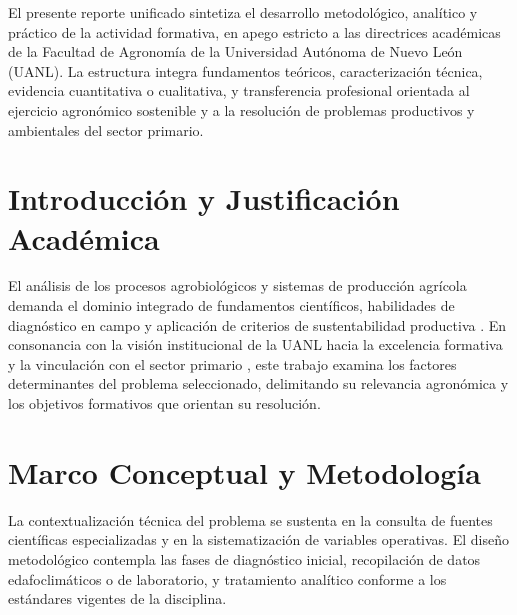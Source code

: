 \documentclass[
	spanish,
	letterpaper,
	oneside
]{article}
\begin{document}
\institutionalWatermark[0.08]{\careerwatermarkimage}
\templatePortrait

\templatePagecfg

\begin{abstractd}
El presente reporte unificado sintetiza el desarrollo metodológico, analítico y práctico de la actividad formativa, en apego estricto a las directrices académicas de la Facultad de Agronomía de la Universidad Autónoma de Nuevo León (UANL). La estructura integra fundamentos teóricos, caracterización técnica, evidencia cuantitativa o cualitativa, y transferencia profesional orientada al ejercicio agronómico sostenible y a la resolución de problemas productivos y ambientales del sector primario.
\end{abstractd}

\templateIndex

\templateFinalcfg


\section{Introducción y Justificación Académica}
\label{sec:introduccion}

El análisis de los procesos agrobiológicos y sistemas de producción agrícola demanda el dominio integrado de fundamentos científicos, habilidades de diagnóstico en campo y aplicación de criterios de sustentabilidad productiva \citep{uanlModeloEducativo2022}. En consonancia con la visión institucional de la UANL hacia la excelencia formativa y la vinculación con el sector primario \citep{uanlVision2030}, este trabajo examina los factores determinantes del problema seleccionado, delimitando su relevancia agronómica y los objetivos formativos que orientan su resolución.

\section{Marco Conceptual y Metodología}
\label{sec:marco-metodologico}

La contextualización técnica del problema se sustenta en la consulta de fuentes científicas especializadas y en la sistematización de variables operativas. El diseño metodológico contempla las fases de diagnóstico inicial, recopilación de datos edafoclimáticos o de laboratorio, y tratamiento analítico conforme a los estándares vigentes de la disciplina.
\end{document}
